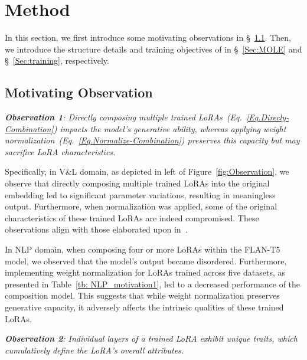 \section{Method}
In this section, we first introduce some motivating observations in \S~\ref{Sec:Observation}. Then, we introduce the structure details and training objectives of \our{} in \S~\ref{Sec:MOLE} and \S~\ref{Sec:training}, respectively.
\subsection{Motivating Observation}
\label{Sec:Observation}

\begin{tcolorbox}[colback=gray!20, colframe=gray!50, sharp corners, center title]
\textit{\small \textbf{Observation 1}: \textit{Directly composing multiple trained LoRAs~(Eq.~\ref{Eq.Direcly-Combination}) impacts the model's generative ability, whereas applying weight normalization~(Eq.~\ref{Eq.Normalize-Combination}) preserves this capacity but may sacrifice LoRA characteristics.}}
\end{tcolorbox}

Specifically, in V\&L domain, as depicted in left of Figure~\ref{fig:Observation}, we observe that directly composing multiple trained LoRAs into the original embedding led to significant parameter variations, resulting in meaningless output. Furthermore, when normalization was applied, some of the original characteristics of these trained LoRAs are indeed compromised. These observations align with those elaborated upon in~\citep{gu2023mix}.

In NLP domain, when composing four or more LoRAs within the FLAN-T5~\citep{flant5} model, we observed that the model's output became disordered.
Furthermore, implementing weight normalization for LoRAs trained across five datasets, as presented in Table~\ref{tb: NLP_motivation1}, led to a decreased performance of the composition model. This suggests that while weight normalization preserves generative capacity, it adversely affects the intrinsic qualities of these trained LoRAs.

\begin{tcolorbox}[colback=gray!20, colframe=gray!50, sharp corners, center title]
\textit{\small \textbf{Observation 2}: \textit{Individual layers of a trained LoRA exhibit unique traits, which cumulatively define the LoRA's overall attributes.}}
\end{tcolorbox}

